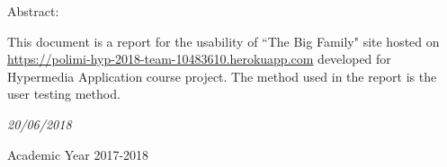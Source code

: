 \documentclass[a4paper,12pt,twoside]{report}
\begin{document}
\begin{center}
\begin{center}
\vspace{10mm}
Abstract:
\vspace{-4mm}
\end{center}
\end{center}
\large{This document is a report for the usability of ``The Big Family" site hosted on \href{https://polimi-hyp-2018-team-10483610.herokuapp.com}{https://polimi-hyp-2018-team-10483610.herokuapp.com} developed for Hypermedia Application course project. The method used in the report is the user testing method.}
\vspace{10mm}


\begin{center}
\vspace{-4mm}
\it{\large{20/06/2018}}
\end{center}
\begin{center}
\vspace{-4mm}
{\large{Academic Year 2017-2018}}
\end{center}

\end{document}
